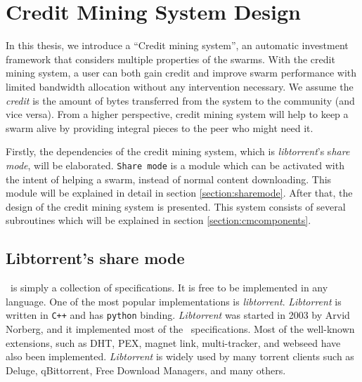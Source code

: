 \chapter{Credit Mining System Design}
\label{chp:design}

In this thesis, we introduce a ``Credit mining system'', an automatic investment framework that considers multiple properties of the swarms. With the credit mining system, a user can both gain credit and improve swarm performance with limited bandwidth allocation without any intervention necessary. We assume the \textit{credit} is the amount of bytes transferred from the system to the community (and vice versa). From a higher perspective, credit mining system will help to keep a swarm alive by providing integral pieces to the peer who might need it. 

Firstly, the dependencies of the credit mining system, which is \textit{libtorrent}'s s\textit{hare mode}, will be elaborated. \texttt{Share mode} is a module which can be activated with the intent of helping a swarm, instead of normal content downloading. This module will be explained in detail in section \ref{section:sharemode}. After that, the design of the credit mining system is presented. This system consists of several subroutines which will be explained in section \ref{section:cmcomponents}. 

\section{Libtorrent's share mode}
\label{section:libtorrent}
\label{section:sharemode}
\bt~is simply a collection of specifications. It is free to be implemented in any language. One of the most popular implementations is \textit{libtorrent}. \textit{Libtorrent} is written in \texttt{C++} and  has \texttt{python} binding. \textit{Libtorrent} was started in 2003 by Arvid Norberg, and it implemented most of the \bt~specifications. Most of the well-known extensions, such as DHT, PEX, magnet link, multi-tracker, and webseed have also been implemented. \textit{Libtorrent} is widely used by many torrent clients such as Deluge, qBittorrent, Free Download Managers, and many others.

